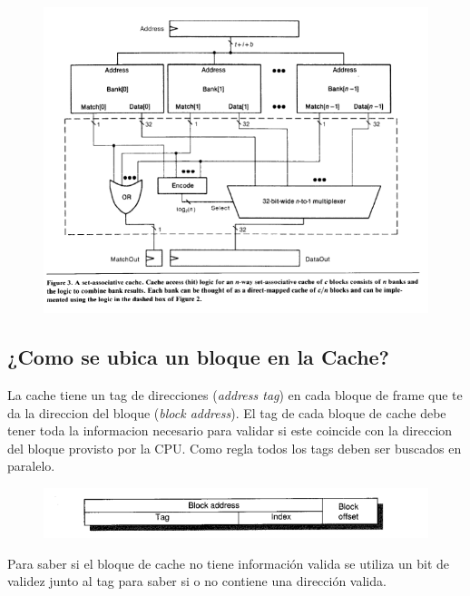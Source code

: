 \documentclass{article}
\begin{document}
\newpage

\begin{figure}[h!]
    \includegraphics[width=\linewidth]{imagenes/CacheNWayAssosiative.png}
\end{figure}

\newpage

\subsection{¿Como se ubica un bloque en la Cache?}

La cache tiene un tag de direcciones (\textit{address tag}) en cada bloque de frame que te da la direccion del bloque (\textit{block address}).
El tag de cada bloque de cache debe tener toda la informacion necesario para validar si este coincide con la direccion del bloque provisto por la CPU.
Como regla todos los tags deben ser buscados en paralelo.


\begin{figure}[h!]
    \includegraphics[width=\linewidth]{imagenes/DireccionVsCache.png}
\end{figure}

Para saber si el bloque de cache no tiene información valida se utiliza un bit de validez junto al tag para saber si o no contiene una dirección valida.
\end{document}
